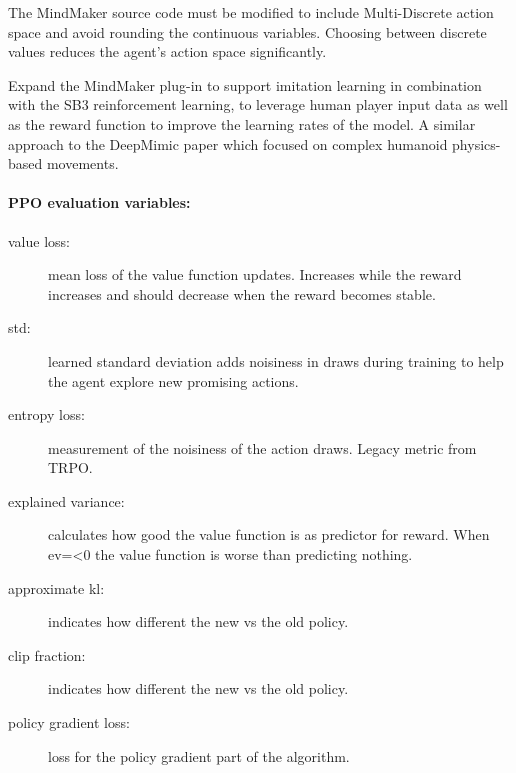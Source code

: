 \documentclass[a4paper,one side,12pt]{book}
\begin{document}
The MindMaker source code must be modified to include Multi-Discrete
action space and avoid rounding the continuous variables. Choosing between discrete values reduces the
agent's action space significantly.

Expand the MindMaker plug-in to support imitation learning in
combination with the SB3 reinforcement learning, to leverage human
player input data as well as the reward function to improve the learning
rates of the model. A similar approach to the DeepMimic paper \cite{peng_2018_deepmimic}
which focused on complex humanoid physics-based movements.\\

\paragraph{PPO evaluation variables:\\}

\begin{description}
  \item[value loss:] mean loss of the value function updates. Increases while the reward increases and should decrease when the reward becomes stable.
  \item[std:] learned standard deviation adds noisiness in draws during training to help the agent explore new promising actions.
  \item[entropy loss:] measurement of the noisiness of the action draws. Legacy metric from TRPO.
  \item[explained variance:] calculates how good the value function is as predictor for reward. When ev=<0 the value function is worse than predicting nothing.
  \item[approximate kl:] indicates how different the new vs the old policy.
  \item[clip fraction:] indicates how different the new vs the old policy.
  \item[policy gradient loss:] loss for the policy gradient part of the algorithm.
\end{description}
\end{document}
